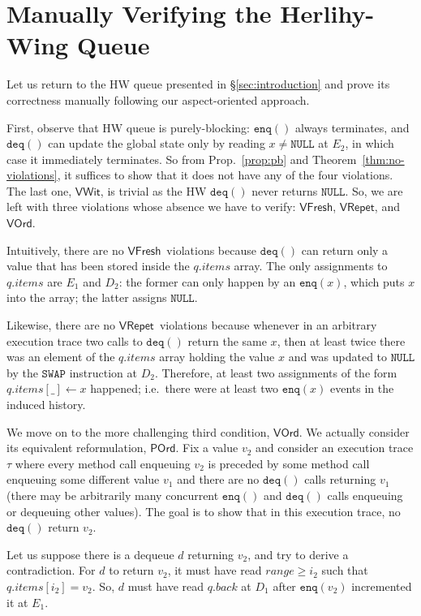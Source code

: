 \documentclass{LMCS}
\newcommand{\NULL}{\ensuremath{\mathtt{NULL}}}
\newcommand{\enq}{\ensuremath{\mathtt{enq}}}
\newcommand{\deq}{\ensuremath{\mathtt{deq}}}
\newcommand{\VFresh}{\ensuremath{\mathsf{VFresh}}}
\newcommand{\VRepet}{\ensuremath{\mathsf{VRepet}}}
\newcommand{\VOrd}{\ensuremath{\mathsf{VOrd}}}
\newcommand{\VWit}{\ensuremath{\mathsf{VWit}}}
\newcommand{\POrd}{\ensuremath{\mathsf{POrd}}}
\begin{document}
\section{Manually Verifying the Herlihy-Wing Queue}
\label{sec:herlihy-wing}

Let us return to the HW queue presented in \S\ref{sec:introduction} and prove
its correctness manually following our aspect-oriented approach.

First, observe that HW queue is purely-blocking: $\enq()$ always terminates,
and $\deq()$ can update the global state only by reading $x\neq\NULL$ at $E_2$,
in which case it immediately terminates.
So from Prop.~\ref{prop:pb} and Theorem~\ref{thm:no-violations}, it suffices
to show that it does not have any of the four violations.
The last one, \VWit, is trivial as the HW $\deq()$ never returns $\NULL$.
So, we are left with three violations
whose absence we have to verify: \VFresh, \VRepet, and \VOrd. 

Intuitively, there are no \VFresh\ violations because $\deq()$ can return only a value that
has been stored inside the $q.items$ array.  The only assignments to $q.items$
are $E_1$ and $D_2$: the former can only happen by an $\enq(x)$, which puts $x$ into
the array; the latter assigns $\NULL$.

Likewise, there are no \VRepet\ violations because whenever in an arbitrary execution trace two calls to
$\deq()$ return the same $x$, then at least twice there was an element of 
the $q.items$ array holding the value $x$ and was updated to $\NULL$ by
the $\texttt{SWAP}$ instruction at $D_2$.
Therefore, at least two assignments of the form $q.items[\_] \gets x$ happened; 
i.e.\ there were at least two $\enq(x)$ events in the induced history.

We move on to the more challenging third condition, \VOrd. 
We actually consider its equivalent reformulation, \POrd.
Fix a value $v_2$ and consider an execution trace $\tau$ where every method call enqueuing $v_2$ 
is preceded by some method call enqueuing some different value $v_1$ and there
are no $\deq()$ calls returning $v_1$ (there may be arbitrarily many concurrent
$\enq()$ and $\deq()$ calls enqueuing or dequeuing other values). 
The goal is to show that in this execution trace, no $\deq()$ return $v_2$.

Let us suppose there is a dequeue $d$ returning $v_2$, and try to derive a contradiction.
For $d$ to return $v_2$, it must have read $\mathit{range} \geq i_2$ such that
$q.items[i_2] = v_2$. So, $d$ must have read $q.back$ at $D_1$ after
$\enq(v_2)$ incremented it at $E_1$.
\end{document}
